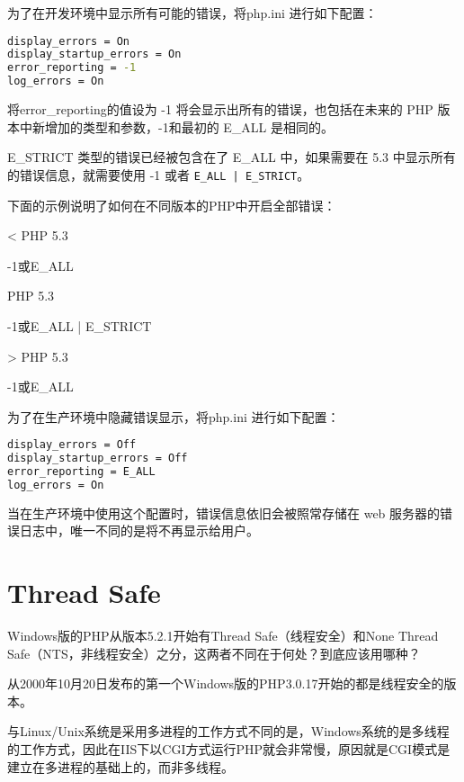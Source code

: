 为了在开发环境中显示所有可能的错误，将php.ini 进行如下配置：

\begin{lstlisting}[language=bash]
display_errors = On
display_startup_errors = On
error_reporting = -1
log_errors = On
\end{lstlisting}

将error\_reporting的值设为 -1 将会显示出所有的错误，也包括在未来的 PHP 版本中新增加的类型和参数，-1和最初的 E\_ALL 是相同的。

E\_STRICT 类型的错误已经被包含在了 E\_ALL 中，如果需要在 5.3 中显示所有的错误信息，就需要使用 -1 或者 \texttt{E\_ALL | E\_STRICT}。

下面的示例说明了如何在不同版本的PHP中开启全部错误：

\begin{compactitem}
\item < PHP 5.3 

-1或E\_ALL
\item PHP 5.3 

-1或E\_ALL | E\_STRICT

\item > PHP 5.3

-1或E\_ALL
\end{compactitem}

为了在生产环境中隐藏错误显示，将php.ini 进行如下配置：

\begin{lstlisting}[language=bash]
display_errors = Off
display_startup_errors = Off
error_reporting = E_ALL
log_errors = On
\end{lstlisting}

当在生产环境中使用这个配置时，错误信息依旧会被照常存储在 web 服务器的错误日志中，唯一不同的是将不再显示给用户。




\section{Thread Safe}

Windows版的PHP从版本5.2.1开始有Thread Safe（线程安全）和None Thread Safe（NTS，非线程安全）之分，这两者不同在于何处\cite{thread_safe}？到底应该用哪种？

从2000年10月20日发布的第一个Windows版的PHP3.0.17开始的都是线程安全的版本。

与Linux/Unix系统是采用多进程的工作方式不同的是，Windows系统的是多线程的工作方式，因此在IIS下以CGI方式运行PHP就会非常慢，原因就是CGI模式是建立在多进程的基础上的，而非多线程。

